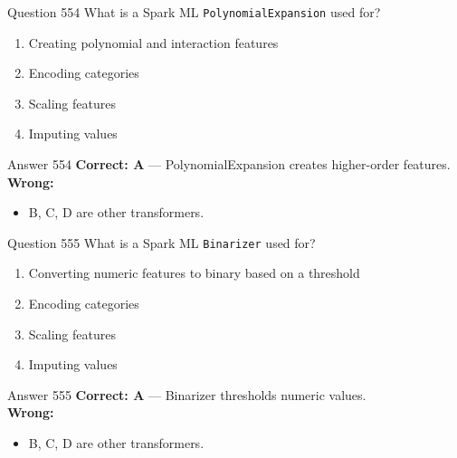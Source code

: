\documentclass[aspectratio=169,11pt]{beamer}
\begin{document}
	\begin{frame}{Question 554}
		What is a Spark ML \texttt{PolynomialExpansion} used for?
		\begin{enumerate}[label=\Alph*.]
			\item Creating polynomial and interaction features
			\item Encoding categories
			\item Scaling features
			\item Imputing values
		\end{enumerate}
	\end{frame}
	\begin{frame}{Answer 554}
		\textbf{Correct: A} --- PolynomialExpansion creates higher-order features.\\
		\vspace{0.5em}
		\textbf{Wrong:}
		\begin{itemize}
			\item B, C, D are other transformers.
		\end{itemize}
	\end{frame}
	
	\begin{frame}{Question 555}
		What is a Spark ML \texttt{Binarizer} used for?
		\begin{enumerate}[label=\Alph*.]
			\item Converting numeric features to binary based on a threshold
			\item Encoding categories
			\item Scaling features
			\item Imputing values
		\end{enumerate}
	\end{frame}
	\begin{frame}{Answer 555}
		\textbf{Correct: A} --- Binarizer thresholds numeric values.\\
		\vspace{0.5em}
		\textbf{Wrong:}
		\begin{itemize}
			\item B, C, D are other transformers.
		\end{itemize}
	\end{frame}
	
\end{document}
